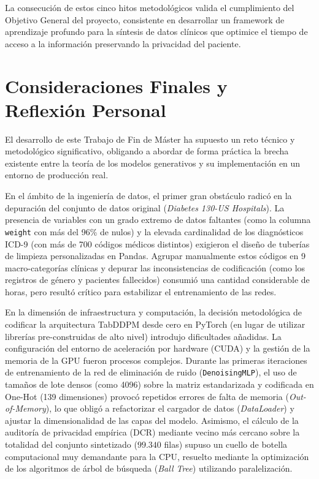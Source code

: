 La consecución de estos cinco hitos metodológicos valida el cumplimiento del Objetivo General del proyecto, consistente en desarrollar un framework de aprendizaje profundo para la síntesis de datos clínicos que optimice el tiempo de acceso a la información preservando la privacidad del paciente.

\section{Consideraciones Finales y Reflexión Personal}

El desarrollo de este Trabajo de Fin de Máster ha supuesto un reto técnico y metodológico significativo, obligando a abordar de forma práctica la brecha existente entre la teoría de los modelos generativos y su implementación en un entorno de producción real.

En el ámbito de la ingeniería de datos, el primer gran obstáculo radicó en la depuración del conjunto de datos original (\textit{Diabetes 130-US Hospitals}). La presencia de variables con un grado extremo de datos faltantes (como la columna \texttt{weight} con más del 96\% de nulos) y la elevada cardinalidad de los diagnósticos ICD-9 (con más de 700 códigos médicos distintos) exigieron el diseño de tuberías de limpieza personalizadas en Pandas. Agrupar manualmente estos códigos en 9 macro-categorías clínicas y depurar las inconsistencias de codificación (como los registros de género y pacientes fallecidos) consumió una cantidad considerable de horas, pero resultó crítico para estabilizar el entrenamiento de las redes.

En la dimensión de infraestructura y computación, la decisión metodológica de codificar la arquitectura TabDDPM desde cero en PyTorch (en lugar de utilizar librerías pre-construidas de alto nivel) introdujo dificultades añadidas. La configuración del entorno de aceleración por hardware (CUDA) y la gestión de la memoria de la GPU fueron procesos complejos. Durante las primeras iteraciones de entrenamiento de la red de eliminación de ruido (\texttt{DenoisingMLP}), el uso de tamaños de lote densos (como 4096) sobre la matriz estandarizada y codificada en One-Hot (139 dimensiones) provocó repetidos errores de falta de memoria (\textit{Out-of-Memory}), lo que obligó a refactorizar el cargador de datos (\textit{DataLoader}) y ajustar la dimensionalidad de las capas del modelo. Asimismo, el cálculo de la auditoría de privacidad empírica (DCR) mediante vecino más cercano sobre la totalidad del conjunto sintetizado ($99.340$ filas) supuso un cuello de botella computacional muy demandante para la CPU, resuelto mediante la optimización de los algoritmos de árbol de búsqueda (\textit{Ball Tree}) utilizando paralelización.

